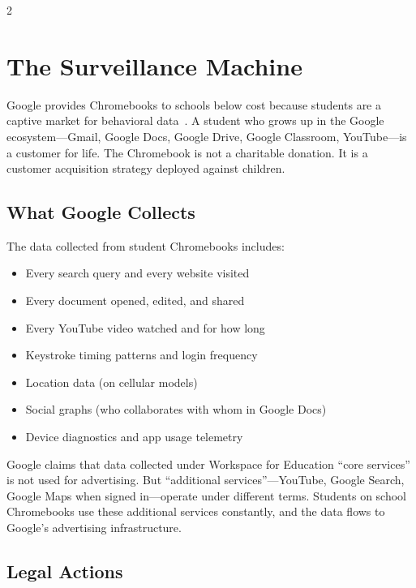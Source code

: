 \documentclass[11pt, a4paper]{article}
\begin{document}
\begin{multicols}{2}

\section{The Surveillance Machine}
\label{sec:surveillance}

Google provides Chromebooks to schools below cost because students are a captive market for behavioral data~\citep{zuboff2019surveillance, doctorow2020attack}. A student who grows up in the Google ecosystem---Gmail, Google Docs, Google Drive, Google Classroom, YouTube---is a customer for life. The Chromebook is not a charitable donation. It is a customer acquisition strategy deployed against children.

\subsection{What Google Collects}

The data collected from student Chromebooks includes:

\begin{itemize}
  \item Every search query and every website visited
  \item Every document opened, edited, and shared
  \item Every YouTube video watched and for how long
  \item Keystroke timing patterns and login frequency
  \item Location data (on cellular models)
  \item Social graphs (who collaborates with whom in Google Docs)
  \item Device diagnostics and app usage telemetry
\end{itemize}

Google claims that data collected under Workspace for Education ``core services'' is not used for advertising. But ``additional services''---YouTube, Google Search, Google Maps when signed in---operate under different terms. Students on school Chromebooks use these additional services constantly, and the data flows to Google's advertising infrastructure.

\subsection{Legal Actions}


\end{multicols}
\end{document}
